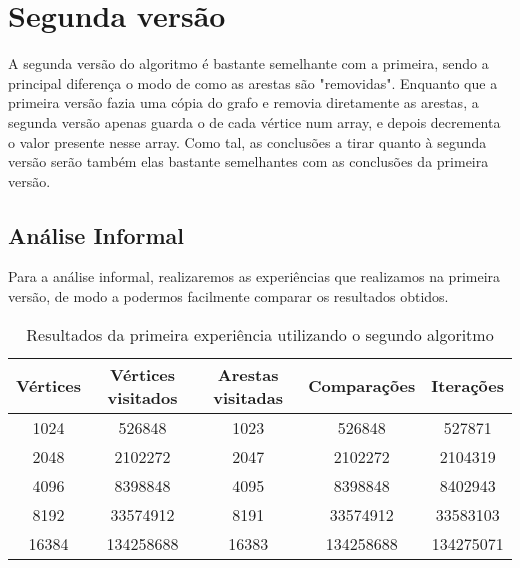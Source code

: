 \chapter{Segunda versão}

A segunda versão do algoritmo é bastante semelhante com a primeira, sendo a
principal diferença o modo de como as arestas são "removidas". Enquanto que a
primeira versão fazia uma cópia do grafo e removia diretamente as arestas, a
segunda versão apenas guarda o  de cada vértice num array, e
depois decrementa o valor presente nesse array. Como tal, as conclusões a tirar
quanto à segunda versão serão também elas bastante semelhantes com as conclusões
da primeira versão.


\section{Análise Informal}
Para a análise informal, realizaremos as experiências
que realizamos na primeira versão, de modo a podermos
facilmente comparar os resultados obtidos.

\begin{table}[H]
	\centering
	\begin{tabular}{| c || c | c | c | c |}
		\hline
		Vértices & Vértices visitados & Arestas visitadas & Comparações & Iterações \\
		\hline\hline
		1024     & 526848             & 1023              & 526848      & 527871    \\
		2048     & 2102272            & 2047              & 2102272     & 2104319   \\
		4096     & 8398848            & 4095              & 8398848     & 8402943   \\
		8192     & 33574912           & 8191              & 33574912    & 33583103  \\
		16384    & 134258688          & 16383             & 134258688   & 134275071 \\
		\hline
	\end{tabular}
	\caption{Resultados da primeira experiência utilizando o segundo algoritmo}
	\label{2-1}
\end{table}

